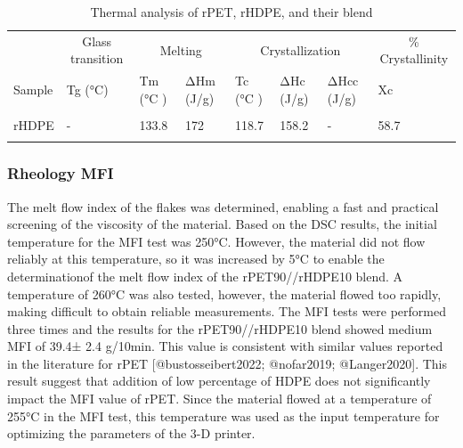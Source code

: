 \documentclass[
  letterpaper,
  DIV=11,
  numbers=noendperiod]{scrartcl}
\begin{document}
\begin{table}
\caption{Thermal analysis of rPET, rHDPE, and their blend}\tabularnewline

\centering\begingroup\fontsize{8}{10}\selectfont

\begin{tabular}[t]{llllllll}
\toprule
\multicolumn{1}{c}{ } & \multicolumn{1}{c}{Glass transition} & \multicolumn{2}{c}{Melting} & \multicolumn{3}{c}{Crystallization } & \multicolumn{1}{c}{\% Crystallinity} \\
\cmidrule(l{3pt}r{3pt}){2-2} \cmidrule(l{3pt}r{3pt}){3-4} \cmidrule(l{3pt}r{3pt}){5-7} \cmidrule(l{3pt}r{3pt}){8-8}
Sample & Tg (°C) & Tm  (°C ) & ΔHm (J/g) & Tc  (°C ) & ΔHc (J/g) & ΔHcc (J/g) & Xc\\
\midrule
\cellcolor{gray!6}{rPET} & \cellcolor{gray!6}{82} & \cellcolor{gray!6}{249.9} & \cellcolor{gray!6}{32.3} & \cellcolor{gray!6}{196.7} & \cellcolor{gray!6}{33.3} & \cellcolor{gray!6}{-} & \cellcolor{gray!6}{23.1}\\
rHDPE & - & 133.8 & 172 & 118.7 & 158.2 & - & 58.7\\
\cellcolor{gray!6}{rPET90/rHDPE10} & \cellcolor{gray!6}{77 / -} & \cellcolor{gray!6}{254/131.7} & \cellcolor{gray!6}{40.3/1.30} & \cellcolor{gray!6}{210.6/117.4} & \cellcolor{gray!6}{37.9/6.7} & \cellcolor{gray!6}{6.8} & \cellcolor{gray!6}{26.6 / 18.8}\\
\bottomrule
\end{tabular}
\endgroup{}
\end{table}

\hypertarget{rheology-mfi}{%
\subsubsection{Rheology MFI}\label{rheology-mfi}}

The melt flow index of the flakes was determined, enabling a fast and
practical screening of the viscosity of the material. Based on the DSC
results, the initial temperature for the MFI test was 250°C. However,
the material did not flow reliably at this temperature, so it was
increased by 5°C to enable the determinationof the melt flow index of
the rPET90//rHDPE10 blend. A temperature of 260°C was also tested,
however, the material flowed too rapidly, making difficult to obtain
reliable measurements. The MFI tests were performed three times and the
results for the rPET90//rHDPE10 blend showed medium MFI of 39.4± 2.4
g/10min. This value is consistent with similar values reported in the
literature for rPET {[}@bustosseibert2022; @nofar2019; @Langer2020{]}.
This result suggest that addition of low percentage of HDPE does not
significantly impact the MFI value of rPET. Since the material flowed at
a temperature of 255°C in the MFI test, this temperature was used as the
input temperature for optimizing the parameters of the 3-D printer.
\end{document}
